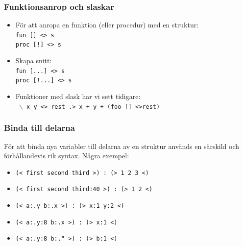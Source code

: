 \documentclass[noamsthm,handout]{beamer}
\begin{document}
\begin{frame}\frametitle{Funktionsanrop och slaskar}
  \begin{itemize}
  \item För att anropa en funktion (eller procedur) med en struktur:\\
    \texttt{fun [] {\color{red}<>} s}\\
    \texttt{proc [!] {\color{red}<>} s}
  \item Skapa snitt:\\
    \texttt{fun [...] {\color{red}<>} s}\\
    \texttt{proc [!...] {\color{red}<>} s}
  \item Funktioner med slask har vi sett tidigare:\\
    \texttt{%
      $\backslash$ x y {\color{red}<>} rest .> x + y + (foo [] <>rest)
    }
  \end{itemize}
\end{frame}
\begin{frame}\frametitle{Binda till delarna}
  För att binda nya variabler till delarna av en struktur används en särskild och förhållandevis rik syntax.  Några exempel:
  \begin{itemize}
  \item \texttt{{\color{red}(<} first second third {\color{red}>)} {\color{red}:} (> 1 2 3 <)}
  \item \texttt{{\color{red}(<} first second third:40 {\color{red}>)} {\color{red}:} (> 1 2 <)}
  \item \texttt{{\color{red}(<} a:.y b:.x {\color{red}>)} {\color{red}:} (> x:1 y:2 <)}
  \item \texttt{{\color{red}(<} a:.y:8 b:.x {\color{red}>)} {\color{red}:} (> x:1 <)}
  \item \texttt{{\color{red}(<} a:.y:8 b:."{} {\color{red}>)} {\color{red}:} (> b:1 <)}
  \end{itemize}
  
\end{frame}
\end{document}
